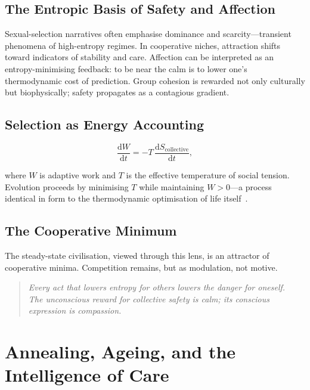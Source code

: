 \documentclass[12pt,a4paper]{article}
\theoremstyle{definition}
\newcommand{\ddt}[1]{\frac{\mathrm{d}#1}{\mathrm{d}t}}
\begin{document}
\subsection{The Entropic Basis of Safety and Affection}

Sexual-selection narratives often emphasise dominance and scarcity---transient
phenomena of high-entropy regimes.  In cooperative niches, attraction shifts
toward indicators of stability and care.  Affection can be interpreted as an
entropy-minimising feedback: to be near the calm is to lower one's
thermodynamic cost of prediction.  Group cohesion is rewarded not only
culturally but biophysically; safety propagates as a contagious gradient.

\subsection{Selection as Energy Accounting}

\begin{equation}
  \ddt{W} = -T\,\ddt{S_{\mathrm{collective}}},
\end{equation}

where $W$ is adaptive work and $T$ is the effective temperature of social
tension.  Evolution proceeds by minimising $T$ while maintaining $W > 0$---a
process identical in form to the thermodynamic optimisation of
life itself~\citep{dalziel2022,friston2023}.

\subsection{The Cooperative Minimum}

The steady-state civilisation, viewed through this lens, is an attractor of
cooperative minima.  Competition remains, but as modulation, not motive.

\begin{quote}
  \itshape
  Every act that lowers entropy for others lowers the danger for oneself.\\
  The unconscious reward for collective safety is calm; its conscious
  expression is compassion.
\end{quote}

\section{Annealing, Ageing, and the Intelligence of Care}
\label{sec:annealing}
\end{document}
